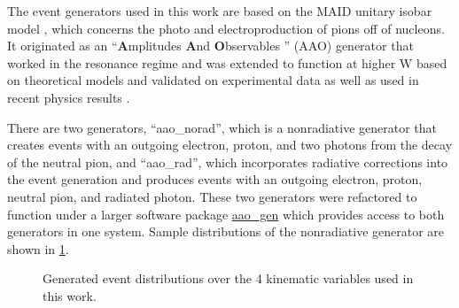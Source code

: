 The event generators used in this work are based on the MAID unitary isobar model \parencite{Tiator2006MAIDTechniques}, \parencite{Dreschsel1992ThresholdNucleons} which concerns the photo and electroproduction of pions off of nucleons. It originated as an ``\textbf{A}mplitudes \textbf{A}nd \textbf{O}bservables '' (AAO) generator that worked in the resonance regime \parencite{Burkert1991AmplitudesGenerator} and was extended to function at higher W based on theoretical models \parencite{Goloskokov2010AnElectroproduction} and validated on experimental data \parencite{Bedlinskiy2014ExclusiveCLAS} as well as used in recent physics results \parencite{Diehl2022MultidimensionalRegion}. 

There are two generators, ``aao\_norad'', which is a nonradiative generator that creates events with an outgoing electron, proton, and two photons from the decay of the neutral pion, and ``aao\_rad'', which incorporates radiative corrections into the event generation and produces events with an outgoing electron, proton, neutral pion, and radiated photon. These two generators were refactored to function under a larger software package \href{https://github.com/JeffersonLab/aao_gen}{aao\_gen} which provides access to both generators in one system. Sample distributions of the nonradiative generator are shown in \ref{fig:aao_norad_gen}.

    \begin{figure}[H]
        \centering
        \hfill
        \caption[Generated Event Distributions]{Generated event distributions over the 4 kinematic variables used in this work.}\label{fig:aao_norad_gen}
    \end{figure}


